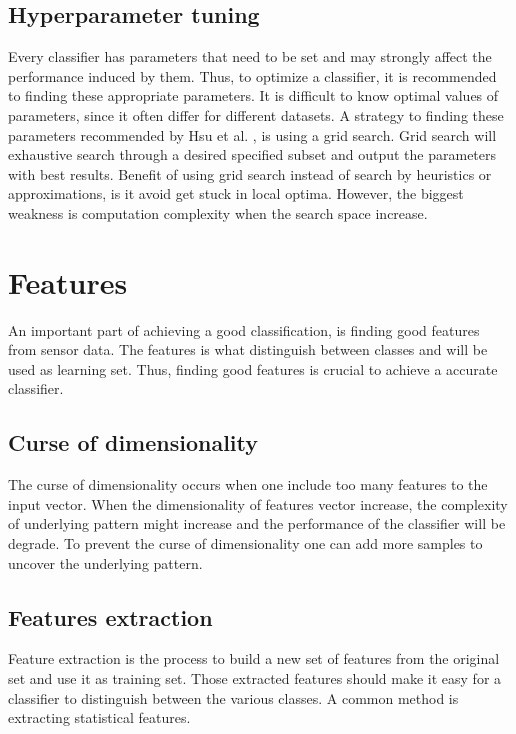 \documentclass[USenglish]{ifimaster}  %
\begin{document}
\subsection{Hyperparameter tuning}\label{sub:hypt}
Every classifier has parameters that need to be set and may strongly affect the performance induced by them. Thus, to optimize a classifier, it is recommended to finding these appropriate parameters. It is difficult to know optimal values of parameters, since it often differ for different datasets. A strategy to finding these parameters recommended by Hsu et al. \cite{Hsu10apractical}, is using a grid search. Grid search will exhaustive search through a desired specified subset and output the parameters with best results. Benefit of using grid search instead of search by heuristics or approximations, is it avoid get stuck in local optima. However, the biggest weakness is computation complexity when the search space increase. 


\section{Features} \label{features}
An important part of achieving a good classification, is finding good features from sensor data. The features is what distinguish between classes and will be used as learning set. Thus, finding good features is crucial to achieve a accurate classifier.
	
\subsection{Curse of dimensionality}\label{curseDim}
The curse of dimensionality occurs when one include too many features to the input vector. When the dimensionality of features vector increase, the complexity of underlying pattern might increase and the performance of the classifier will be degrade. To prevent the curse of dimensionality one can add more samples to uncover the underlying pattern.
	
\subsection{Features extraction} \label{feature_extraction}
Feature extraction is the process to build a new set of features from the original set and use it as training set. Those extracted features should make it easy for a classifier to distinguish between the various classes. A common method is extracting statistical features.
	
\end{document}
